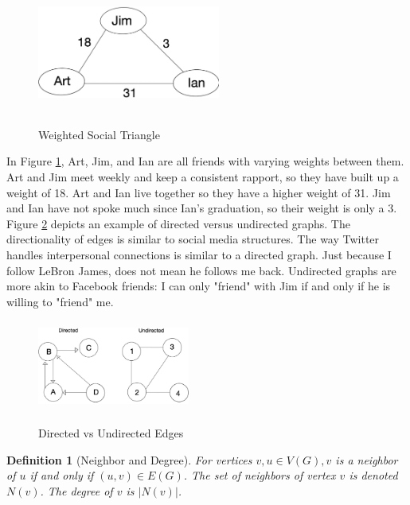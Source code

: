 \documentclass[12pt,twoside]{reedthesis}
\newtheorem{definition}{Definition} %
\begin{document}
\begin{figure}[h]
	\centering
	\caption{Weighted Social Triangle }
	\includegraphics[width=6cm, height=4cm]{social_triangle}
	\label{fig:social_triangle} %
\end{figure}

In Figure \ref{fig:social_triangle}, Art, Jim, and Ian are all friends with varying weights between them. Art and Jim meet weekly and keep a consistent rapport, so they have built up a weight of 18. Art and Ian live together so they have a higher weight of 31. Jim and Ian have not spoke much since Ian's graduation, so their weight is only a 3. Figure \ref{fig:dir_undir} depicts an example of directed versus undirected graphs. The directionality of edges is similar to social media structures. The way Twitter handles interpersonal connections is similar to a directed graph. Just because I follow LeBron James, does not mean he follows me back. Undirected graphs are more akin to Facebook friends: I can only "friend" with Jim if and only if he is willing to "friend" me. 

\begin{figure}[h]
	\centering
	\caption{Directed vs Undirected Edges}
	\includegraphics[width=5cm, height=3cm]{directed_undirected}
	\label{fig:dir_undir} %
\end{figure}


\begin{definition} [Neighbor and Degree]
\label{def:neighbor_degree}
For vertices $v, u \in V(G), v$ is a neighbor of $u$ if and only if $(u,v) \in E(G)$. The set of neighbors of vertex $v$ is denoted $N(v)$. The degree of $v$ is $ | N(v)|$.
\end{definition}
\end{document}
